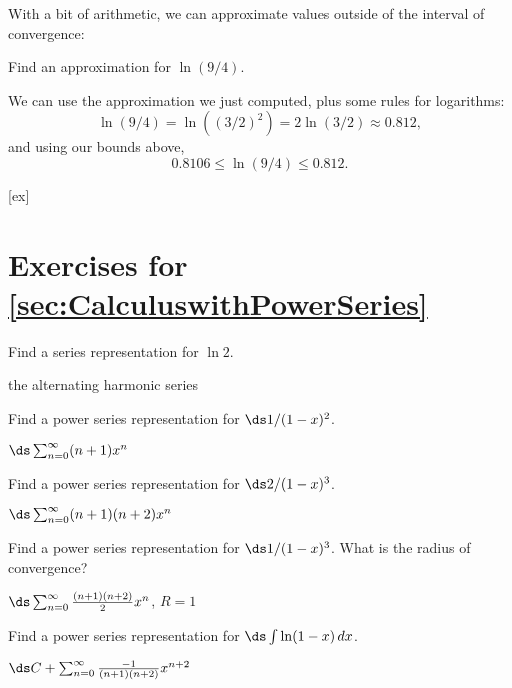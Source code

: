 With a bit of arithmetic, we can approximate values outside of the interval of convergence:

\begin{example}{}{}
Find an approximation for $\ln(9/4)$.
\end{example}
\begin{solution}
We can use the approximation we just computed, plus some rules for logarithms:
$$\ln(9/4)=\ln((3/2)^2)=2\ln(3/2)\approx 0.812,$$
and using our bounds above,
$$0.8106\leq \ln(9/4)\leq 0.812.$$
\end{solution}


[ex]
\section*{Exercises for \ref{sec:CalculuswithPowerSeries}}

\begin{enumialphparenastyle}

\begin{ex}
Find a series representation for $\ln 2$.
\begin{sol}
the alternating harmonic series
\end{sol}
\end{ex}

\begin{ex}
Find a power series representation for $\ds 1/(1-x)^2$.
\begin{sol}
$\ds\sum_{n=0}^\infty (n+1)x^n$
\end{sol}
\end{ex}

\begin{ex}
Find a power series representation for $\ds 2/(1-x)^3$.
\begin{sol}
$\ds\sum_{n=0}^\infty (n+1)(n+2)x^n$
\end{sol}
\end{ex}

\begin{ex}
Find a power series representation for $\ds 1/(1-x)^3$.
What is the radius of convergence?
\begin{sol}
$\ds\sum_{n=0}^\infty {(n+1)(n+2)\over 2}x^n$, $R=1$
\end{sol}
\end{ex}

\begin{ex}
Find a power series representation for $\ds\int\ln(1-x)\,dx$.
\begin{sol}
$\ds C+\sum_{n=0}^\infty {-1\over (n+1)(n+2)}x^{n+2}$ 
\end{sol}
\end{ex}

\end{enumialphparenastyle}
\clearpage